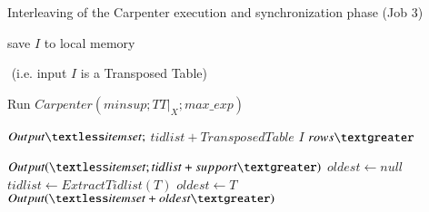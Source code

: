 \begin{algorithm}[H]
\scriptsize
\centering
\caption{Interleaving of the Carpenter execution and synchronization phase (Job 3)}
 \label{job3}
 \begin{algorithmic}[1]
\State save $I$ to local memory

\Else $ $ (i.e. input $I$ is a Transposed Table)

\State Run $Carpenter (minsup;  TT|_{X};max\_exp)$

\State $Output \textless itemset;$ $tidlist+Transposed
Table$ $I$ $rows  \textgreater$
\EndFor


\EndIf
{}
\State $Output(  \textless itemset;tidlist+support \textgreater) $
\EndFor
\EndProcedure
{}
\State $oldest\gets null$
\State $tidlist\gets ExtractTidlist(T)$
 \State $oldest\gets T$
\EndIf
\EndFor
\State $Output(\textless itemset+oldest\textgreater )$
 \EndProcedure
 \end{algorithmic}
\end{algorithm}

